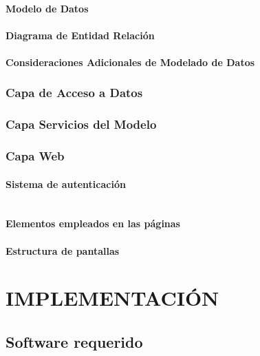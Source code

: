 \documentclass[12pt, a4paper, twoside]{book}
\begin{document}
	\subsubsection{Modelo de Datos}

	\subsubsection{Diagrama de Entidad Relación}	
	
	\subsubsection{Consideraciones Adicionales de Modelado de Datos}
	
	\subsection{Capa de Acceso a Datos}
	
	\subsection{Capa Servicios del Modelo}
	
	\subsection{Capa Web}
	
	\subsubsection{Sistema de autenticación}

	\begin{lstlisting}
	\end{lstlisting}
	
	\subsubsection{Elementos empleados en las páginas}
	
	\subsubsection{Estructura de pantallas}
	
	\chapter{IMPLEMENTACIÓN}
	\section{Software requerido}
\end{document}

